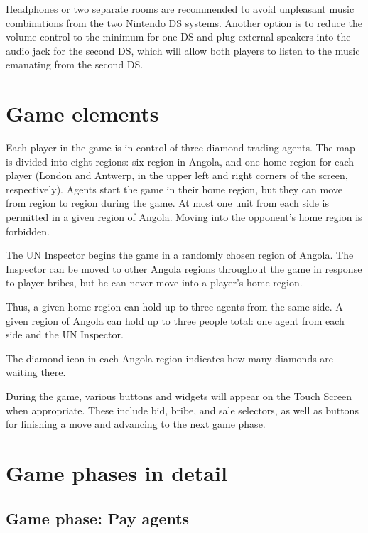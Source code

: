\documentclass[8pt]{extbook}
\begin{document}
Headphones or two separate rooms are recommended to avoid unpleasant music combinations from the two Nintendo DS systems.  Another option is to reduce the volume control to the minimum for one DS and plug external speakers into the audio jack for the second DS, which will allow both players to listen to the music emanating from the second DS.









\section{Game elements}

Each player in the game is in control of three diamond trading agents.  The map is divided into eight regions:  six region in Angola, and one home region for each player (London and Antwerp, in the upper left and right corners of the screen, respectively).  Agents start the game in their home region, but they can move from region to region during the game.  At most one unit from each side is permitted in a given region of Angola.  Moving into the opponent's home region is forbidden.

The UN Inspector begins the game in a randomly chosen region of Angola.  The Inspector can be moved to other Angola regions throughout the game in response to player bribes, but he can never move into a player's home region.

Thus, a given home region can hold up to three agents from the same side.  A given region of Angola can hold up to three people total:  one agent from each side and the UN Inspector.

The diamond icon in each Angola region indicates how many diamonds are waiting there.

During the game, various buttons and widgets will appear on the Touch Screen when appropriate.  These include bid, bribe, and sale selectors, as well as buttons for finishing a move and advancing to the next game phase.





\section{Game phases in detail}

\subsection{Game phase:  Pay agents}
\label{sec:payPhase}
\end{document}
